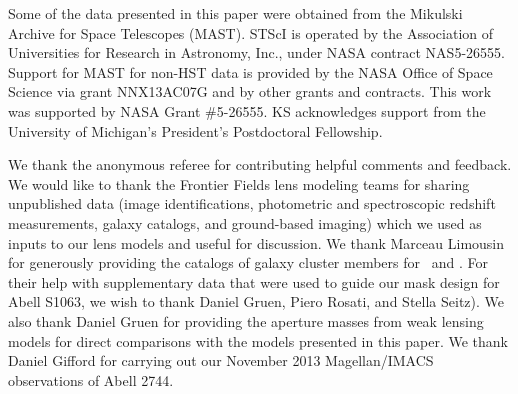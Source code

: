 \vspace{24pt}

Some of the data presented in this paper were obtained from the Mikulski Archive for Space Telescopes (MAST). STScI is operated by the Association of Universities for Research in Astronomy, Inc., under NASA contract NAS5-26555. Support for MAST for non-HST data is provided by the NASA Office of Space Science via grant NNX13AC07G and by other grants and contracts. This work was supported by NASA Grant \#5-26555. KS acknowledges support from the University of Michigan's President's Postdoctoral Fellowship.

We thank the anonymous referee for contributing helpful comments and feedback. We would like to thank the Frontier Fields lens modeling teams for sharing unpublished data (image identifications, photometric and spectroscopic redshift measurements, galaxy catalogs, and ground-based imaging) which we used as inputs to our lens models and useful for discussion. We thank Marceau Limousin for generously providing the catalogs of galaxy cluster members for \MACSzeroseven\ and \MACSeleven. For their help with supplementary data that were used to guide our mask design for Abell S1063, we wish to thank Daniel Gruen, Piero Rosati, and Stella Seitz). We also thank Daniel Gruen for providing the aperture masses from weak lensing models for direct comparisons with the models presented in this paper. We thank Daniel Gifford for carrying out our November 2013 Magellan/IMACS observations of Abell 2744.


